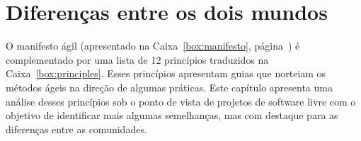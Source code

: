 \chapter{Diferenças entre os dois mundos}
\label{cap:diferencas}

O manifesto ágil (apresentado na Caixa~\ref{box:manifesto},
página~\pageref{box:manifesto}) é complementado por uma lista de 12
princípios traduzidos na Caixa~\ref{box:principles}. Esses princípios
apresentam guias que norteiam os métodos ágeis na direção de algumas
práticas. Este capítulo apresenta uma análise desses princípios sob o
ponto de vista de projetos de software livre com o objetivo de
identificar mais algumas semelhanças, mas com destaque para as
diferenças entre as comunidades.


